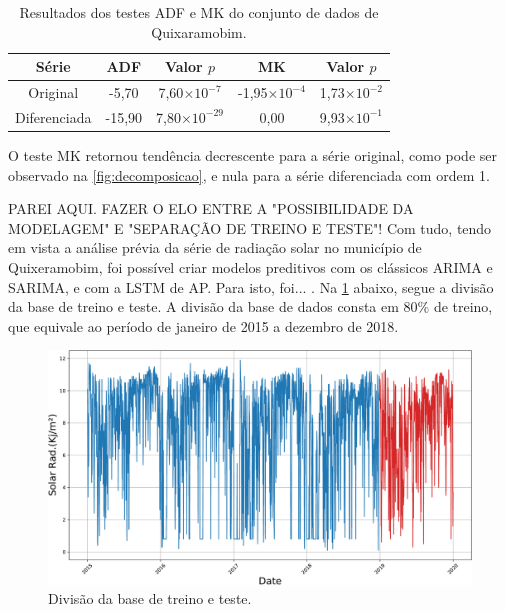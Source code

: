 \documentclass[a4paper]{ifacconf}
\begin{document}
\begin{table}
	\centering
	\caption{Resultados dos testes  \ac{ADF} e \ac{MK} do conjunto de dados de Quixaramobim.}
	\begin{tabularx}{\columnwidth}{ccCCC} 
		\toprule
		Série        & \ac{ADF} & Valor $p$             & \ac{MK}               & Valor $p$ \\
		\midrule
		Original     & -5,70    & 7,60$\times 10^{-7}$  & -1,95$\times 10^{-4}$ & 1,73$\times 10^{-2}$   \\ %
		Diferenciada & -15,90   & 7,80$\times 10^{-29}$ & 0,00                  & 9,93$\times 10^{-1}$   \\
		\bottomrule
	\end{tabularx}
\end{table}
O teste \ac{MK} retornou tendência decrescente para a série original, como pode ser observado na \ref{fig:decomposicao}, e nula para a série diferenciada com ordem 1.

{\color{purple}PAREI AQUI. FAZER O ELO ENTRE A "POSSIBILIDADE DA MODELAGEM" E "SEPARAÇÃO DE TREINO E TESTE"! }
Com tudo, tendo em vista a análise prévia da série de radiação solar no município de Quixeramobim, foi possível criar modelos preditivos com os clássicos \ac{ARIMA} e \ac{SARIMA}, e com a \ac{LSTM} de \ac{AP}. Para isto, foi... . Na \ref{fig:train_test} abaixo, segue a divisão da base de treino e teste. A divisão da base de dados consta em $80\%$
de treino, que equivale ao período de janeiro de 2015 a dezembro de 2018.
\begin{figure} 
	\centering
	\includegraphics[width=0.9\columnwidth]{images/train_test.pdf}
	\caption{Divisão da base de treino e teste.}\label{fig:train_test}
\end{figure}

\end{document}
